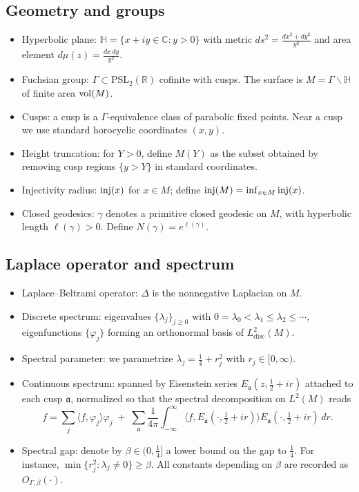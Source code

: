 \subsection*{Geometry and groups}
\begin{itemize}
  \item Hyperbolic plane: $\mathbb{H}=\{x+iy\in\mathbb{C}: y>0\}$ 
    with metric $ds^2=\frac{dx^2+dy^2}{y^2}$ 
    and area element $d\mu(z)=\frac{dx\,dy}{y^2}$.
  \item Fuchsian group: $\Gamma\subset \mathrm{PSL}_2(\mathbb{R})$ 
    cofinite with cusps. The surface is $M=\Gamma\backslash\mathbb{H}$ 
    of finite area $\operatorname{vol}(M)$.
  \item Cusps: a cusp is a $\Gamma$-equivalence class of parabolic fixed points. 
    Near a cusp we use standard horocyclic coordinates $(x,y)$.
  \item Height truncation: for $Y>0$, define $M(Y)$ as the subset obtained 
    by removing cusp regions $\{y>Y\}$ in standard coordinates.
  \item Injectivity radius: $\operatorname{inj}(x)$ for $x\in M$; define $\operatorname{inj}(M)=\inf_{x\in M}\operatorname{inj}(x)$.
  \item Closed geodesics: $\gamma$ denotes a primitive closed geodesic on $M$, 
    with hyperbolic length $\ell(\gamma)>0$. 
    Define $N(\gamma)=e^{\ell(\gamma)}$.
\end{itemize}

\subsection*{Laplace operator and spectrum}
\begin{itemize}
  \item Laplace--Beltrami operator: $\Delta$ is the nonnegative Laplacian on $M$.
  \item Discrete spectrum: eigenvalues $\{\lambda_j\}_{j\ge 0}$ with 
    $0=\lambda_0<\lambda_1\le \lambda_2\le\cdots$, 
    eigenfunctions $\{\varphi_j\}$ forming an orthonormal basis of $L^2_{\mathrm{disc}}(M)$.
  \item Spectral parameter: we parametrize $\lambda_j=\tfrac{1}{4}+r_j^2$ with $r_j\in[0,\infty)$.
  \item Continuous spectrum: spanned by Eisenstein series 
    $E_{\mathfrak{a}}(z,\tfrac{1}{2}+ir)$ attached to each cusp $\mathfrak{a}$, 
    normalized so that the spectral decomposition on $L^2(M)$ reads
    \[
      f=\sum_j \langle f,\varphi_j\rangle \varphi_j 
        \;+\; \sum_{\mathfrak{a}}\frac{1}{4\pi}\int_{-\infty}^{\infty} 
        \langle f,E_{\mathfrak{a}}(\cdot,\tfrac{1}{2}+ir)\rangle 
        E_{\mathfrak{a}}(\cdot,\tfrac{1}{2}+ir)\,dr.
    \]
  \item Spectral gap: denote by $\beta\in(0,\tfrac{1}{4}]$ a lower bound on the gap to $\tfrac{1}{4}$. 
    For instance, $\min\{r_j^2:\lambda_j\ne 0\}\ge \beta$. 
    All constants depending on $\beta$ are recorded as $O_{\Gamma,\beta}(\cdot)$.
\end{itemize}

